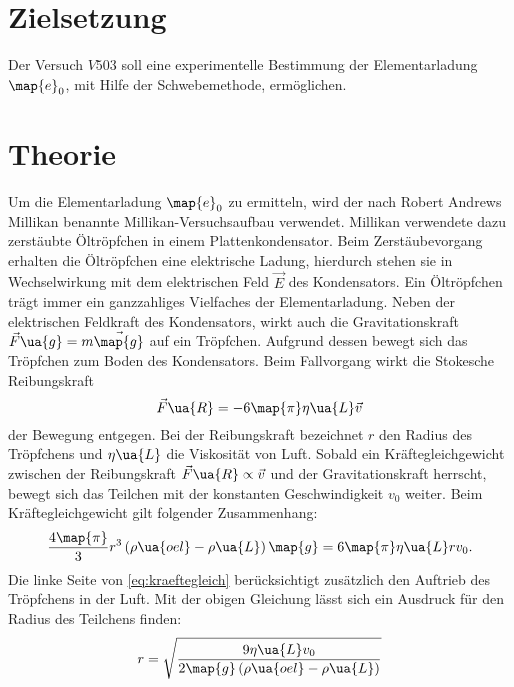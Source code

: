 \setcounter{page}{1}
\section*{Zielsetzung}
Der Versuch $V503$ soll eine experimentelle Bestimmung der Elementarladung $\map{e}_0$, mit Hilfe der Schwebemethode, ermöglichen.
\section{Theorie}
Um die Elementarladung $\map{e}_0$ zu ermitteln, wird der nach Robert Andrews Millikan benannte %
Millikan-Versuchsaufbau verwendet. Millikan verwendete dazu zerstäubte Öltröpfchen in einem %
Plattenkondensator. Beim Zerstäubevorgang erhalten die Öltröpfchen eine elektrische
Ladung, hierdurch stehen sie in Wechselwirkung mit dem elektrischen Feld $\vec{E}$ des
Kondensators. Ein Öltröpfchen trägt immer ein ganzzahliges Vielfaches der Elementarladung. %
Neben der elektrischen Feldkraft des Kondensators, wirkt auch die Gravitationskraft %
$\vec{F}\ua{g}=m\vec{\map{g}}$ auf ein Tröpfchen. %
Aufgrund dessen bewegt sich das Tröpfchen zum Boden
des Kondensators. Beim Fallvorgang wirkt die Stokesche Reibungskraft %
\begin{equation*}
  \vec{F}\ua{R}=-6\map{\pi}\eta\ua{L}\vec{v}
\end{equation*}
der Bewegung entgegen. Bei der Reibungskraft bezeichnet $r$ den Radius des
Tröpfchens und $\eta\ua{L}$ die Viskosität von Luft. Sobald ein Kräftegleichgewicht
zwischen der Reibungskraft $\vec{F}\ua{R}\propto \vec{v}$ und der Gravitationskraft
herrscht, bewegt sich das Teilchen mit der konstanten Geschwindigkeit $v_0$ weiter.
Beim Kräftegleichgewicht gilt folgender Zusammenhang:
\begin{equation}
  \label{eq:kraeftegleich}
  \frac{4\map{\pi}}{3}r^3\left(\rho\ua{oel}-\rho\ua{L}\right)\map{g}=6\map{\pi}\eta\ua{L}r v_0.
\end{equation}
Die linke Seite von \eqref{eq:kraeftegleich} berücksichtigt zusätzlich den Auftrieb des %
Tröpfchens in der Luft. Mit der obigen Gleichung lässt sich ein Ausdruck für den Radius %
des Teilchens finden: %
\begin{equation}
  \label{eq:radius_teilchen}
  r=\sqrt{\frac{9\eta\ua{L}v_0}{2\map{g}\left(\rho\ua{oel}-\rho\ua{L}\right)}}
\end{equation}
